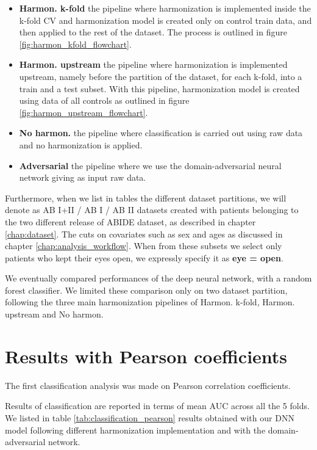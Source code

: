 \documentclass[11pt]{report}
\begin{document}
\begin{itemize}
 \item \textbf{Harmon. k-fold} the pipeline where harmonization is implemented inside the k-fold CV and harmonization model is created only on control train data, and then applied to the rest of the dataset. The process is outlined in figure \ref{fig:harmon_kfold_flowchart}. 
 \item \textbf{Harmon. upstream} the pipeline where harmonization is implemented upstream, namely before the partition of the dataset, for each k-fold, into a train and a test subset. With this pipeline, harmonization model is created using data of all controls as outlined in figure \ref{fig:harmon_upstream_flowchart}. 
 \item \textbf{No harmon.} the pipeline where classification is carried out using raw data and no harmonization is applied. 
 \item \textbf{Adversarial} the pipeline where we use the domain-adversarial neural network giving as input raw data.
\end{itemize}

Furthermore, when we list in tables the different dataset partitions, we will denote as AB I+II / AB I / AB II datasets created with patients belonging to the two different release of ABIDE dataset, as described in chapter \ref{chap:dataset}.
The cuts on covariates such as sex and ages as discussed in chapter \ref{chap:analysis_workflow}.
When from these subsets we select only patients who kept their eyes open, we expressly specify it as \textbf{eye = open}.

We eventually compared performances of the deep neural network, with a random forest classifier.
We limited these comparison only on two dataset partition, following the three main harmonization pipelines of Harmon. k-fold, Harmon. upstream and No harmon.  


\section{Results with Pearson coefficients}\label{sec:pearson_results}
The first classification analysis was made on Pearson correlation coefficients. 

Results of classification are reported in terms of mean AUC across all the 5 folds.
We listed in table \ref{tab:classification_pearson} results obtained with our DNN model following different harmonization implementation and with the domain-adversarial network.
\end{document}
